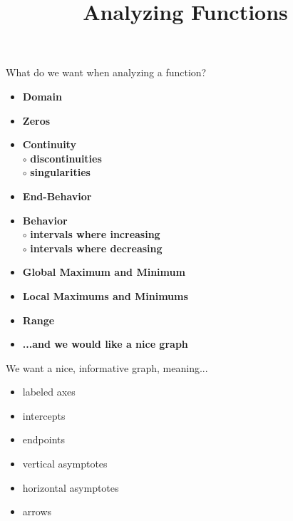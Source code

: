 \documentclass{ximera}
\title{Analyzing Functions}
\begin{document}
\begin{abstract}
%
\end{abstract}
\maketitle






What do we want when analyzing a function?

\begin{itemize}
     \item \textbf{\textcolor{red!70!black}{Domain}} 
     \item \textbf{\textcolor{red!70!black}{Zeros}} 
     \item \textbf{\textcolor{red!70!black}{Continuity}} \\
     \text{    }$\circ$ \textbf{\textcolor{purple!85!blue}{discontinuities}}\\
     \text{    }$\circ$ \textbf{\textcolor{purple!85!blue}{singularities}}\\
     \item \textbf{\textcolor{red!70!black}{End-Behavior}} 
     \item \textbf{\textcolor{red!70!black}{Behavior}} \\
     \text{    }$\circ$ \textbf{\textcolor{purple!85!blue}{intervals where increasing}}\\
     \text{    }$\circ$ \textbf{\textcolor{purple!85!blue}{intervals where decreasing}}\\
     \item \textbf{\textcolor{red!70!black}{Global Maximum and Minimum}} 
     \item \textbf{\textcolor{red!70!black}{Local Maximums and Minimums}} 
     \item \textbf{\textcolor{red!70!black}{Range}} 
     \item \textbf{\textcolor{blue!55!black}{...and we would like a nice graph}} 
\end{itemize}







We want a nice, informative graph, meaning...
\begin{itemize}
	\item labeled axes
	\item intercepts
	\item endpoints
	\item vertical asymptotes
	\item horizontal asymptotes
	\item arrows
\end{itemize}
\end{document}
